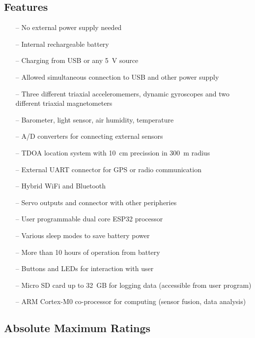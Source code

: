 \subsection{Features}
\begin{itemize}
	\setlength\itemsep{0.2em}
	\item[--] No external power supply needed
	\item[--] Internal rechargeable battery
	\item[--] Charging from USB or any \SI{5}{V} source
	\item[--] Allowed simultaneous connection to USB and other power supply
	\item[--] Three different triaxial acceleromemers, dynamic gyroscopes and two different triaxial magnetometers
	\item[--] Barometer, light sensor, air humidity, temperature
	\item[--] A/D converters for connecting external sensors
	\item[--] TDOA location system with \SI{10}{cm} precission in \SI{300}{m} radius
	\item[--] External UART connector for GPS or radio communication
	\item[--] Hybrid WiFi and Bluetooth
	\item[--] Servo outputs and connector with other peripheries
	\item[--] User programmable dual core ESP32 processor
	\item[--] Various sleep modes to save battery power
	\item[--] More than 10 hours of operation from battery
	\item[--] Buttons and LEDs for interaction with user
	\item[--] Micro SD card up to \SI{32}{GB} for logging data (accessible from user program)
	\item[--] ARM Cortex-M0 co-processor for computing (sensor fusion, data analysis)
\end{itemize}

\subsection{Absolute Maximum Ratings}

